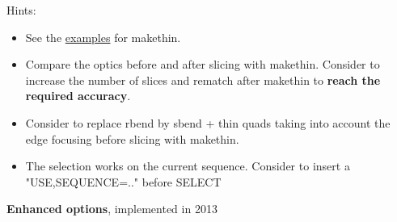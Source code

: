 Hints: 
\begin{itemize}
   \item See the
     \href{http://cern.ch/frs/mad-X_examples/makethin/}{examples} for
     makethin.  
   \item Compare the optics before and after slicing with
     makethin. Consider to increase the number of slices and rematch
     after makethin to \textbf{reach the required accuracy}.  
   \item Consider to replace rbend by sbend + thin quads taking into
     account the edge focusing before slicing with makethin.  
   \item The selection works on the current sequence. Consider to insert
     a "USE,SEQUENCE=.." before SELECT  
\end{itemize}


{\large{\bf Enhanced options}, implemented in 2013}
